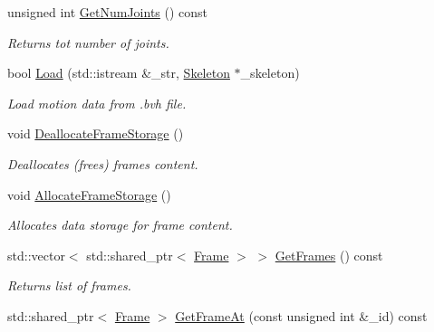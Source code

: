 \begin{DoxyCompactItemize}
unsigned int \hyperlink{class_motion_ac862979f87f5ccebd7eb9997f6d664bf}{Get\+Num\+Joints} () const
\begin{DoxyCompactList}\small\item\em Returns tot number of joints. \end{DoxyCompactList}\item 
bool \hyperlink{class_motion_a4910d036ed1a52d67266740cf435bd25}{Load} (std\+::istream \&\+\_\+str, \hyperlink{class_skeleton}{Skeleton} $\ast$\+\_\+skeleton)
\begin{DoxyCompactList}\small\item\em Load motion data from .bvh file. \end{DoxyCompactList}\item 
void \hyperlink{class_motion_aa75a13334d31ee1a71683bb805e28aa2}{Deallocate\+Frame\+Storage} ()\hypertarget{class_motion_aa75a13334d31ee1a71683bb805e28aa2}{}\label{class_motion_aa75a13334d31ee1a71683bb805e28aa2}

\begin{DoxyCompactList}\small\item\em Deallocates (frees) frames content. \end{DoxyCompactList}\item 
void \hyperlink{class_motion_a4d9c91b108af5582377d035c4fc316b1}{Allocate\+Frame\+Storage} ()\hypertarget{class_motion_a4d9c91b108af5582377d035c4fc316b1}{}\label{class_motion_a4d9c91b108af5582377d035c4fc316b1}

\begin{DoxyCompactList}\small\item\em Allocates data storage for frame content. \end{DoxyCompactList}\item 
std\+::vector$<$ std\+::shared\+\_\+ptr$<$ \hyperlink{class_frame}{Frame} $>$ $>$ \hyperlink{class_motion_a76a546c4f5867d915cc84af890668c57}{Get\+Frames} () const
\begin{DoxyCompactList}\small\item\em Returns list of frames. \end{DoxyCompactList}\item 
std\+::shared\+\_\+ptr$<$ \hyperlink{class_frame}{Frame} $>$ \hyperlink{class_motion_a758f9d19bae22bc775f78d2aa58ab1c5}{Get\+Frame\+At} (const unsigned int \&\+\_\+id) const\hypertarget{class_motion_a758f9d19bae22bc775f78d2aa58ab1c5}{}\label{class_motion_a758f9d19bae22bc775f78d2aa58ab1c5}


\end{DoxyCompactItemize}
